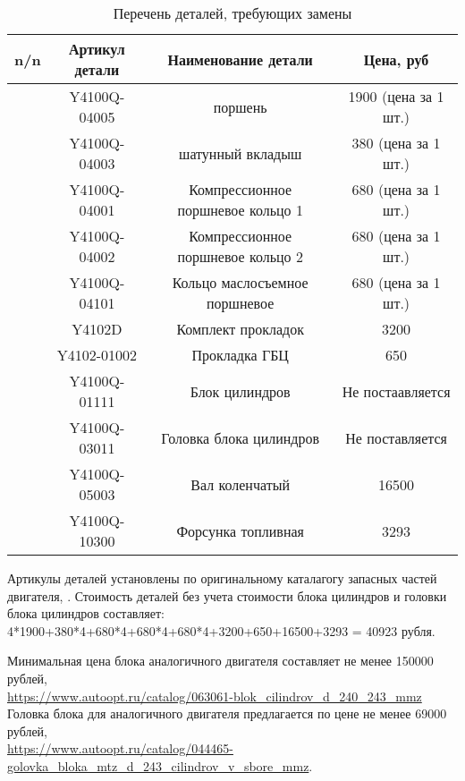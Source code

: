 \begin{table}[H]
		\caption{Перечень деталей, требующих замены}
	{ \begin{tabular}{c|c|c|c}
			\hline
			\textbf{n/n } & {\textbf{Артикул детали}} & \textbf{Наименование детали} &  \textbf{Цена, руб}\\
			\hline
			\Rownum & Y4100Q-04005 & поршень  & 1900 (цена за 1 шт.)\\
			\hline
			\Rownum & Y4100Q-04003 & шатунный вкладыш & 380  (цена за 1 шт.)\\
			\hline
			\Rownum & Y4100Q-04001 & Компрессионное поршневое кольцо 1 & 680 (цена за 1 шт.)\\
			\hline
			\Rownum & Y4100Q-04002 & Компрессионное поршневое кольцо 2 & 680 (цена за 1 шт.)\\
			\hline
			\Rownum & Y4100Q-04101 & Кольцо маслосъемное поршневое & 680 (цена за 1 шт.)\\
			\hline
				\Rownum & Y4102D & Комплект прокладок & 3200\\
			\hline
				\Rownum & Y4102-01002 & Прокладка ГБЦ & 650\\
			\hline
				\Rownum & Y4100Q-01111 & Блок цилиндров & Не постаавляется\\
			\hline
				\Rownum & Y4100Q-03011 & Головка блока цилиндров & Не поставляется\\
			\hline
				\Rownum & Y4100Q-05003 & Вал коленчатый & 16500 \\
			\hline
				\Rownum &  Y4100Q-10300 & Форсунка топливная & 3293\\
			\hline
	\end{tabular}}
	\label{схемазатяжки}
\end{table}\setcounter{rownum}{0}

Артикулы деталей установлены по оригинальному каталагогу запасных частей двигателя, \cite{4102}.
Стоимость деталей без учета стоимости блока цилиндров и головки блока цилиндров составляет: 
4*1900+380*4+680*4+680*4+680*4+3200+650+16500+3293 = 40923 рубля.

Минимальная цена блока аналогичного двигателя  составляет не менее  150000 рублей,\\ \url{https://www.autoopt.ru/catalog/063061-blok_cilindrov_d_240_243_mmz}\\
Головка блока для аналогичного двигателя предлагается по цене  не менее 69000 рублей,\\
\url{https://www.autoopt.ru/catalog/044465-golovka_bloka_mtz_d_243_cilindrov_v_sbore_mmz}.

